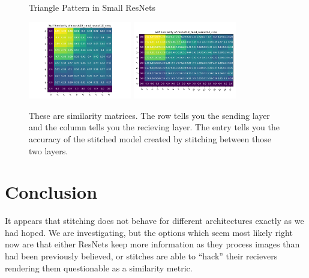 \documentclass{article} %
\begin{document}
\begin{center}
   \begin{figure}[h!]
      \centering
      \caption{Triangle Pattern in Small ResNets}
      \includegraphics[width=4.5cm]{resnet18_rand_resnet18_sims.png}
      \includegraphics[width=4.5cm]{resnet18_rand_resnet34_sims.png}
      \caption*{These are similarity matrices. The row tells you the sending layer and the column tells you the recieving layer.
      The entry tells you the accuracy of the stitched model created by stitching between those two layers.}
   \end{figure}
\end{center}

\section*{Conclusion}
It appears that stitching does not behave for different architectures exactly as we had hoped. We are investigating, but
the options which seem most likely right now are that either ResNets keep more information as they process images than
had been previously believed, or stitches are able to ``hack'' their recievers rendering them questionable as a similarity
metric.
\end{document}
